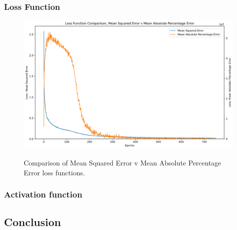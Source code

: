 \FloatBarrier
\subsubsection{Loss Function}
\FloatBarrier
\begin{figure}
    \centering
    \caption{Comparison of Mean Squared Error v Mean Absolute Percentage Error loss functions.}
    \includegraphics[width=\textwidth]{project/img/ml_model/discrete/mse_mpe.png}
    \label{fig:ml_model:mse_mpe}
\end{figure}

\FloatBarrier
\subsubsection{Activation function}


\subsection{Conclusion}
